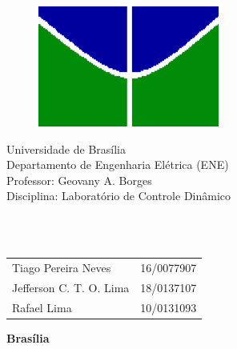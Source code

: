 \begin{figure}[h!]
\centering
\includegraphics[scale=0.9]{img/simb_unb.png}
\label{fig:unb}
\end{figure}

\begin{center}
{\LARGE Universidade de Brasília}\\
Departamento de Engenharia Elétrica (ENE)\\
Professor: Geovany A. Borges\\
Disciplina: Laboratório de Controle Dinâmico\\
\end{center}


\vspace{0.18\textheight}

\begin{center}
    \Huge \textbf{\\\thetitle \\}
\end{center}

\vspace*{\fill} %


\begin{table}[H]
    \begin{tabular}{ll}
        Tiago Pereira Neves & 16/0077907 \\
        Jefferson C. T. O. Lima & 18/0137107 \\
        Rafael Lima & 10/0131093 \\
    \end{tabular}
\end{table}

\vspace{0.5cm}

\begin{center}
    \textbf{Brasília\\
    \the\year} %
\end{center}

\thispagestyle{empty} %

\newpage
\tableofcontents
\newpage

